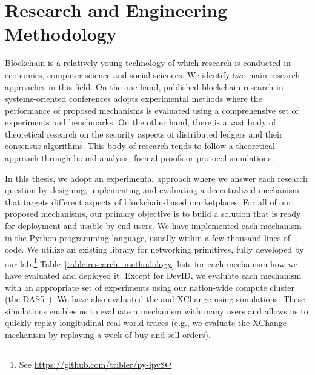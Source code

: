 \section{Research and Engineering Methodology}
Blockchain is a relatively young technology of which research is conducted in economics, computer science and social sciences.
We identify two main research approaches in this field.
On the one hand, published blockchain research in systems-oriented conferences adopts experimental methods where the performance of proposed mechanisms is evaluated using a comprehensive set of experiments and benchmarks.
On the other hand, there is a vast body of theoretical research on the security aspects of distributed ledgers and their consensus algorithms.
This body of research tends to follow a theoretical approach through bound analysis, formal proofs or protocol simulations.

In this thesis, we adopt an experimental approach where we answer each research question by designing, implementing and evaluating a decentralized mechanism that targets different aspects of blockchain-based marketplaces.
For all of our proposed mechanisms, our primary objective is to build a solution that is ready for deployment and usable by end users.
We have implemented each mechanism in the Python programming language, usually within a few thousand lines of code.
We utilize an existing library for networking primitives, fully developed by our lab.\footnote{See \url{https://github.com/tribler/py-ipv8}}
Table~\ref{table:research_methodology} lists for each mechanism how we have evaluated and deployed it.
Except for DevID, we evaluate each mechanism with an appropriate set of experiments using our nation-wide compute cluster (the DAS5~\cite{bal2016medium}).
We have also evaluated the \TrustChain{} and XChange using simulations.
These simulations enables us to evaluate a mechanism with many users and allows us to quickly replay longitudinal real-world traces (e.g., we evaluate the XChange mechanism by replaying a week of buy and sell orders).

